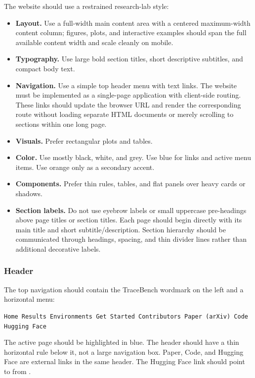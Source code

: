 \documentclass[11pt]{article}
\begin{document}
The website should use a restrained research-lab style:

\begin{itemize}
    \item \textbf{Layout.} Use a full-width main content area with a centered maximum-width content column; figures, plots, and interactive examples should span the full available content width and scale cleanly on mobile.
    \item \textbf{Typography.} Use large bold section titles, short descriptive subtitles, and compact body text.
    \item \textbf{Navigation.} Use a simple top header menu with text links. The website must be implemented as a single-page application with client-side routing. These links should update the browser URL and render the corresponding route without loading separate HTML documents or merely scrolling to sections within one long page.
    \item \textbf{Visuals.} Prefer rectangular plots and tables.
    \item \textbf{Color.} Use mostly black, white, and grey. Use blue for links and active menu items. Use orange only as a secondary accent.
    \item \textbf{Components.} Prefer thin rules, tables, and flat panels over heavy cards or shadows.
    \item \textbf{Section labels.} Do not use eyebrow labels or small uppercase pre-headings above page titles or section titles. 
    Each page should begin directly with its main title and short subtitle/description.
    Section hierarchy should be communicated through headings, spacing, and thin divider lines rather than additional decorative labels.
\end{itemize}

\subsubsection*{Header}

The top navigation should contain the TraceBench wordmark on the left and a horizontal menu:

\begin{center}
\texttt{Home \quad Results \quad Environments \quad Get Started \quad Contributors \quad Paper (arXiv) \quad Code \quad Hugging Face}
\end{center}

The active page should be highlighted in blue.
The header should have a thin horizontal rule below it, not a large navigation box.
Paper, Code, and Hugging Face are external links in the same header.
The Hugging Face link should point to  from .
\end{document}
